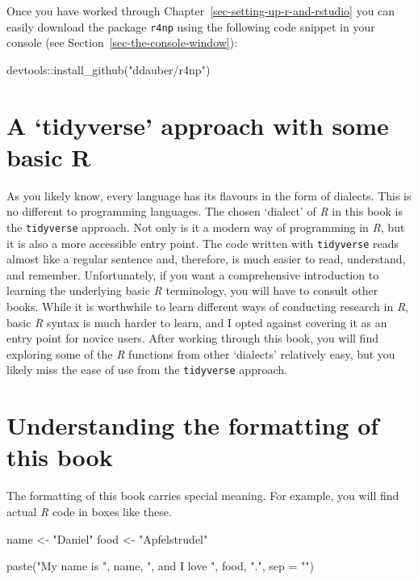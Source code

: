 \documentclass[
  letterpaper,
  DIV=11,
  numbers=noendperiod]{scrreprt}
\newenvironment{Shaded}{\begin{snugshade}}{\end{snugshade}}
\newcommand{\AttributeTok}[1]{\textcolor[rgb]{0.40,0.45,0.13}{#1}}
\newcommand{\FunctionTok}[1]{\textcolor[rgb]{0.28,0.35,0.67}{#1}}
\newcommand{\NormalTok}[1]{\textcolor[rgb]{0.00,0.23,0.31}{#1}}
\newcommand{\OtherTok}[1]{\textcolor[rgb]{0.00,0.23,0.31}{#1}}
\newcommand{\SpecialCharTok}[1]{\textcolor[rgb]{0.37,0.37,0.37}{#1}}
\newcommand{\StringTok}[1]{\textcolor[rgb]{0.13,0.47,0.30}{#1}}
\begin{document}
Once you have worked through Chapter~\ref{sec-setting-up-r-and-rstudio}
you can easily download the package \texttt{r4np} using the following
code snippet in your console (see Section~\ref{sec-the-console-window}):

\begin{Shaded}
\begin{Highlighting}[]
\NormalTok{devtools}\SpecialCharTok{::}\FunctionTok{install\_github}\NormalTok{(}\StringTok{"ddauber/r4np"}\NormalTok{)}
\end{Highlighting}
\end{Shaded}

\section{A `tidyverse' approach with some basic
R}\label{sec-a-tidyverse-approach-with-some-basic-r}

As you likely know, every language has its flavours in the form of
dialects. This is no different to programming languages. The chosen
`dialect' of \emph{R} in this book is the \texttt{tidyverse} approach.
Not only is it a modern way of programming in \emph{R}, but it is also a
more accessible entry point. The code written with \texttt{tidyverse}
reads almost like a regular sentence and, therefore, is much easier to
read, understand, and remember. Unfortunately, if you want a
comprehensive introduction to learning the underlying basic \emph{R}
terminology, you will have to consult other books. While it is
worthwhile to learn different ways of conducting research in \emph{R},
basic \emph{R} syntax is much harder to learn, and I opted against
covering it as an entry point for novice users. After working through
this book, you will find exploring some of the \emph{R} functions from
other `dialects' relatively easy, but you likely miss the ease of use
from the \texttt{tidyverse} approach.

\section{Understanding the formatting of this
book}\label{sec-formatting-of-this-book}

The formatting of this book carries special meaning. For example, you
will find actual \emph{R} code in boxes like these.

\begin{Shaded}
\begin{Highlighting}[]
\NormalTok{name }\OtherTok{\textless{}{-}} \StringTok{"Daniel"}
\NormalTok{food }\OtherTok{\textless{}{-}} \StringTok{"Apfelstrudel"}

\FunctionTok{paste}\NormalTok{(}\StringTok{"My name is "}\NormalTok{, name, }\StringTok{", and I love "}\NormalTok{, food, }\StringTok{"."}\NormalTok{, }\AttributeTok{sep =} \StringTok{""}\NormalTok{)}
\end{Highlighting}
\end{Shaded}
\end{document}
